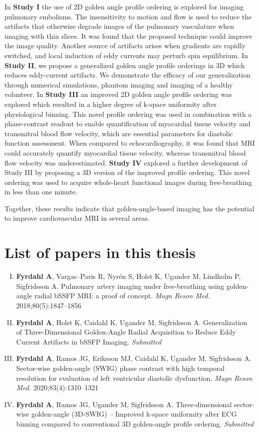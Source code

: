 \documentclass[11pt,twoside,openright]{book}
\begin{document}
In \textbf{Study I} the use of 2D golden angle profile ordering is explored for imaging pulmonary embolisms. The insensitivity to motion and flow is used to reduce the artifacts that otherwise degrade images of the pulmonary vasculature when imaging with thin slices. It was found that the proposed technique could improve the image quality. Another source of artifacts arises when gradients are rapidly switched, and local induction of eddy currents may perturb spin equilibrium. In \textbf{Study II}, we propose a generalized golden angle profile orderings in 3D which reduces eddy-current artifacts. We demonstrate the efficacy of our generalization through numerical simulations, phantom imaging and imaging of a healthy volunteer. In \textbf{Study III} an improved 2D golden angle profile ordering was explored which resulted in a higher degree of k-space uniformity after physiological binning. This novel profile ordering was used in combination with a phase-contrast readout to enable quantification of myocardial tissue velocity and transmitral blood flow velocity, which are essential parameters for diastolic function assessment. When compared to echocardiography, it was found that MRI could accurately quantify myocardial tissue velocity, whereas transmitral blood flow velocity was underestimated. \textbf{Study IV} explored a further development of Study III by proposing a 3D version of the improved profile ordering. This novel ordering was used to acquire whole-heart functional images during free-breathing in less than one minute.

Together, these results indicate that golden-angle-based imaging has the potential to improve cardiovascular MRI in several areas.
\begingroup
\let\cleardoublepage\clearevenpage
\chapter*{List of papers in this thesis}
\thispagestyle{empty}
\begin{enumerate}[I.]
\item \textbf{Fyrdahl A}, Vargas--Paris R, Nyrén S, Holst K, Ugander M, Lindholm P, Sigfridsson A. Pulmonary artery imaging under free-breathing using golden-angle radial bSSFP MRI: a proof of concept. \textit{Magn Reson Med.} 2018;80(5):1847--1856
\item \textbf{Fyrdahl A}, Holst K, Caidahl K, Ugander M, Sigfridsson A. Generalization of Three-Dimensional Golden-Angle Radial Acquisition to Reduce Eddy Current Artifacts in bSSFP Imaging. \textit{Submitted}
\item \textbf{Fyrdahl A}, Ramos JG, Eriksson MJ, Caidahl K, Ugander M, Sigfridsson A. Sector-wise golden-angle (SWIG) phase contrast with high temporal resolution for evaluation of left ventricular diastolic dysfunction. \textit{Magn Reson Med.} 2020;83(4):1310--1321
\item \textbf{Fyrdahl A}, Ramos JG, Ugander M, Sigfridsson A. Three-dimensional sector-wise golden-angle (3D-SWIG) – Improved k-space uniformity after ECG binning compared to conventional 3D golden-angle profile ordering. \textit{Submitted}
\end{enumerate}
\endgroup
\clearpage
\end{document}
